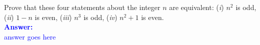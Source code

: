 \item{}
Prove that these four statements about the integer $n$ are equivalent:
(\emph{i}) $n^2$ is odd, (\emph{ii}) $1-n$ is even, (\emph{iii}) $n^3$ is odd,
(\emph{iv}) $n^2+1$ is even.\\[12pt]
\ifanswers
\textcolor{blue}{
\textbf{Answer:}\\[6pt]
answer goes here
}
\newpage
\fi
